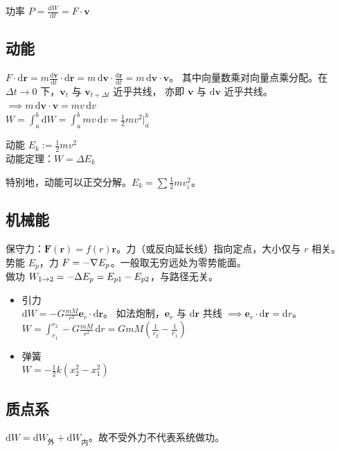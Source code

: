 \documentclass[12pt, a4paper, UTF8, openany]{ctexbook}
\newcommand{\dif}{\mathrm{d}}
\newcommand{\sdif}{\,\mathrm{d}}
\newcommand{\vect}[1]{\mathbf{#1}}
\newcommand{\vecr}{\vect{r}}
\newcommand{\vecv}{\vect{v}}
\begin{document}
    功率 $P = \frac{\dif W}{\dif t} = F \cdot \vecv$

        \subsection{动能}
        $F \cdot \dif\vecr = m \frac{\dif\vecv}{\dif t} \cdot \dif\vecr 
        = m \sdif\vecv \cdot \frac{\dif\vecr}{\dif t} = m \sdif\vecv \cdot \vecv$。
        其中向量数乘对向量点乘分配。在 $\Delta t \to 0$ 下，$\vecv_{t}$ 与 $\vecv_{t + \Delta t}$ 近乎共线，
        亦即 $\vecv$ 与 $\dif\vecv$ 近乎共线。$\implies m \sdif\vecv \cdot \vecv = mv\sdif v$ \\
        $W = \int_{a}^{b} \dif W = \int_{a}^{b} mv\sdif v = \frac{1}{2}mv^2|_{a}^{b}$

        动能 $E_{k} := \frac{1}{2}mv^2$ \\
        动能定理：$W = \Delta E_{k}$

        特别地，{\heiti 动能可以正交分解}。$E_{k} = \sum \frac{1}{2} m v_{i}^2$。

        \subsection{机械能}
        保守力：$\vect{F}(\vect{r}) = f(r)\vecr$。力（或反向延长线）指向定点，大小仅与 $r$ 相关。\\
        势能 $E_{p}$，力 $F = {\color{red}-} \nabla E_{p}$。一般取无穷远处为零势能面。\\
        做功 $W_{1 \to 2} = {\color{red}-} \Delta E_p = E_{p1} - E_{p2}$，与路径无关。

        \begin{itemize}
            \item 引力 \\
                $\dif W = -G \frac{mM}{r^2} \vect{e}_r \cdot \dif\vecr$。
                如法炮制，$\vect{e}_r$ 与 $\dif\vecr$ 共线 $\implies \vect{e}_r \cdot \dif\vecr = \dif r$。\\
                $W = \int_{r_1}^{r_2} -G\frac{mM}{r^2}\sdif r = GmM(\frac{1}{r_2} - \frac{1}{r_1})$
            \item 弹簧 \\
                $W = -\frac{1}{2}k (x_2^2 - x_1^2)$
        \end{itemize}

        \subsection{质点系}
        $\dif W = \dif W_{\text{外}} + \dif W_{\text{内}}$。故不受外力不代表系统做功。
\end{document}
